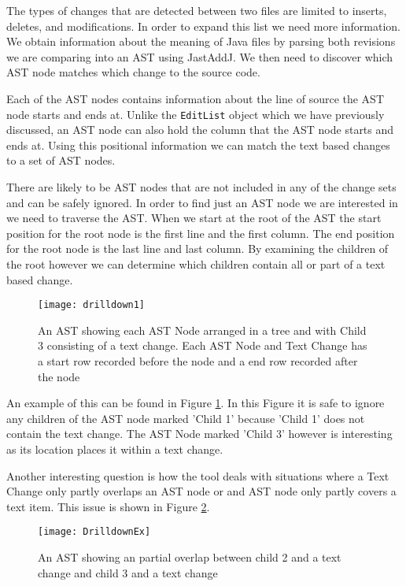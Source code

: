 The types of changes that are detected between two files are limited to inserts, deletes, and modifications. In order to expand this list we need more information.  We obtain information about the meaning of Java files by parsing both revisions we are comparing into an AST using JastAddJ. We then need to discover which AST node matches which change to the source code. 

Each of the AST nodes contains information about the line of source the AST node starts and ends at.  Unlike the \lstinline{EditList} object which we have previously discussed, an AST node can also hold the column that the AST node starts and ends at.  Using this positional information we can match the text based changes to a set of AST nodes.

There are likely to be AST nodes that are not included in any of the change sets and can be safely ignored. In order to find just an AST node we are interested in we need to traverse the AST.  When we start at the root of the AST the start position for the root node is the first line and the first column. The end position for the root node is the last line and last column.  By examining the children of the root however we can determine which children contain all or part of a text based change.

\begin{figure}[!t]
 \begin{center}
  \texttt{[image: drilldown1]}
 \end{center}
 \caption{An AST showing each AST Node arranged in a tree and with Child 3 consisting of a text change.  Each AST Node and Text Change has a start row recorded before the node and a end row recorded after the node}
 \label{fig:findingASTNode}
\end{figure}



An example of this can be found in Figure \ref{fig:findingASTNode}.  In this Figure it is safe to ignore any children of the AST node marked 'Child 1' because 'Child 1' does not contain the text change.  The AST Node marked 'Child 3' however is interesting as its location places it within a text change. 

Another interesting question is how the tool deals with situations where a Text Change only partly overlaps an AST node or and AST node only partly covers a text item.  This issue is shown in Figure \ref{fig:troubleASTNode}.

\begin{figure}[!t]
 \begin{center}
  \texttt{[image: DrilldownEx]}
 \end{center}
 \caption{An AST showing an partial overlap between child 2 and a text change and child 3 and a text change}
 \label{fig:troubleASTNode}
\end{figure}

